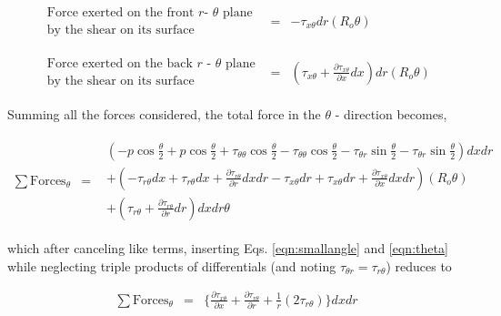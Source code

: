 \begin{displaymath}
	\begin{array}{ccc}
		\begin{array}{c}
		\textrm{Force exerted on the front $r$- $\theta$ plane} \\
		\textrm{by the shear on its surface}
		\end{array} & = &
		-\tau_{x\theta}dr (R_o \theta) \\
   	& \\ & \\
		\begin{array}{c}
		\textrm{Force exerted on the back $r$ - $\theta$ plane}\\
		\textrm{by the shear on its surface}
		\end{array} & = &
		(\tau_{x\theta} + \frac{\partial \tau_{x\theta}}{\partial x}dx) dr (R_o \theta) 
	\end{array}
\end{displaymath}

	Summing all the forces considered, the total force in the $\theta$ - direction becomes,

\begin{displaymath}
	\begin{array}{ccc}
	\sum \textrm{Forces}_\theta & = &
		\begin{array}{c}
			(-p \cos{\frac{\theta}{2}} + p \cos{\frac{\theta}{2}} 
			 + \tau_{\theta \theta}\cos{\frac{\theta}{2}} - \tau_{\theta \theta}\cos{\frac{\theta}{2}}
			-\tau_{\theta r}\sin{\frac{\theta}{2}} -\tau_{\theta r}\sin{\frac{\theta}{2}})dxdr \\
			+ (-\tau_{r\theta}dx + \tau_{r\theta}dx + \frac{\partial \tau_{r\theta}}{\partial r}dxdr
			- \tau_{x\theta}dr + \tau_{x\theta}dr + \frac{\partial \tau_{x\theta}}{\partial x}dxdr)(R_o \theta) \\
			+(\tau_{r\theta} + \frac{\partial \tau_{r\theta}}{\partial r}dr)dxdr \theta
		\end{array}
	\end{array}
\end{displaymath}

	which after canceling like terms, inserting Eqs. \ref{eqn:smallangle} and \ref{eqn:theta} while neglecting 
triple products of differentials (and noting $\tau_{\theta r} = \tau_{r \theta}$) reduces to

\begin{equation}
	\begin{array}{ccc}
	\sum \textrm{Forces}_\theta & = &
		\Big\{\frac{\partial \tau_{x\theta}}{\partial x}
		+ \frac{\partial \tau_{r\theta}}{\partial r} + \frac{1}{r}(2\tau_{r \theta})\Big\}dxdr
	\end{array}
\label{eqn:thetaforces}
\end{equation}


